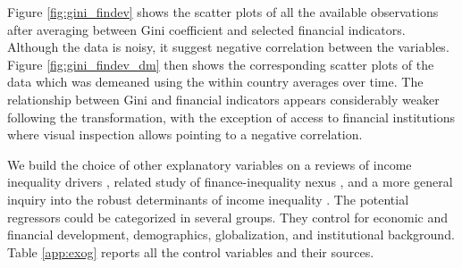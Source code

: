 \documentclass[a4paper,11pt]{article}
\begin{document}
Figure \ref{fig:gini_findev} shows the scatter plots of all the available observations after averaging between Gini coefficient and selected financial indicators. Although the data is noisy, it suggest negative correlation between the variables. Figure \ref{fig:gini_findev_dm} then shows the corresponding scatter plots of the data which was demeaned using the within country averages over time. The relationship between Gini and financial indicators appears considerably weaker following the transformation, with the exception of access to financial institutions where visual inspection allows pointing to a negative correlation.

 
We build the choice of other explanatory variables on a reviews of income inequality drivers \citep{roineetal2009,nolan2019drivers}, related study of finance-inequality nexus \citep{de2017finance}, and a more general inquiry into the robust determinants of income inequality \citep{furceri2019robust}. The potential regressors could be categorized in several groups. They control for economic and financial development, demographics, globalization, and institutional background. Table \ref{app:exog} reports all the control variables and their sources. 






\end{document}
